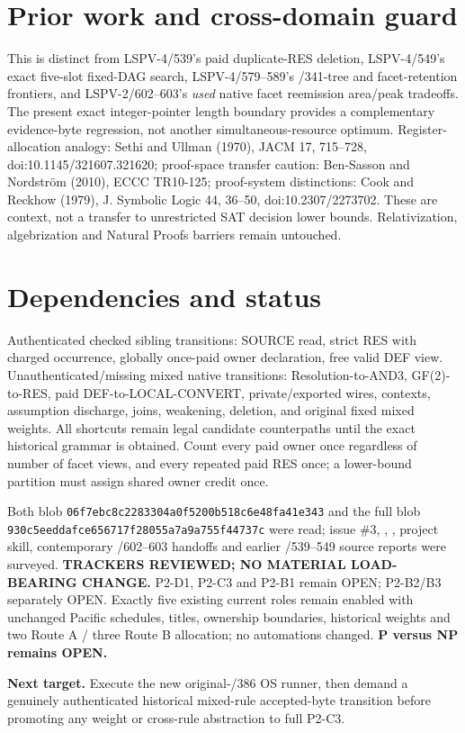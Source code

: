 \documentclass[11pt]{article}
\begin{document}
\section*{Prior work and cross-domain guard}
This is distinct from LSPV-4/539's paid duplicate-RES deletion, LSPV-4/549's exact five-slot fixed-DAG search, LSPV-4/579--589's /341-tree and facet-retention frontiers, and LSPV-2/602--603's \emph{used} native facet reemission area/peak tradeoffs. The present exact integer-pointer length boundary provides a complementary evidence-byte regression, not another simultaneous-resource optimum. Register-allocation analogy: Sethi and Ullman (1970), JACM 17, 715--728, doi:10.1145/321607.321620; proof-space transfer caution: Ben-Sasson and Nordstr\"om (2010), ECCC TR10-125; proof-system distinctions: Cook and Reckhow (1979), J. Symbolic Logic 44, 36--50, doi:10.2307/2273702. These are context, not a transfer to unrestricted SAT decision lower bounds. Relativization, algebrization and Natural Proofs barriers remain untouched.

\section*{Dependencies and status}
Authenticated checked sibling transitions: SOURCE read, strict RES with charged occurrence, globally once-paid owner declaration, free valid DEF view. Unauthenticated/missing mixed native transitions: Resolution-to-AND3, GF(2)-to-RES, paid DEF-to-LOCAL-CONVERT, private/exported wires, contexts, assumption discharge, joins, weakening, deletion, and original fixed mixed weights. All shortcuts remain legal candidate counterpaths until the exact historical grammar is obtained. Count every paid owner once regardless of number of facet views, and every repeated paid RES once; a lower-bound partition must assign shared owner credit once.

Both  blob \texttt{06f7ebc8c2283304a0f5200b518c6e48fa41e343} and the full  blob \texttt{930c5eeddafce656717f28055a7a9a755f44737c} were read; issue \#3, , , project skill, contemporary /602--603 handoffs and earlier /539--549 source reports were surveyed. \textbf{TRACKERS REVIEWED; NO MATERIAL LOAD-BEARING CHANGE.} P2-D1, P2-C3 and P2-B1 remain OPEN; P2-B2/B3 separately OPEN. Exactly five existing current roles remain enabled with unchanged Pacific schedules, titles, ownership boundaries, historical weights and two Route A / three Route B allocation; no automations changed. \textbf{P versus NP remains OPEN.}

\textbf{Next target.} Execute the new original-/386 OS runner, then demand a genuinely authenticated historical mixed-rule accepted-byte transition before promoting any weight or cross-rule abstraction to full P2-C3.
\end{document}
